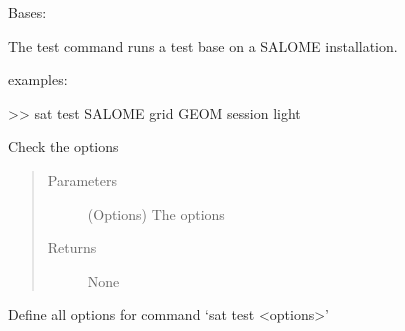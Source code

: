\documentclass[a4paper,10pt,english]{sphinxmanual}
\begin{document}
\begin{fulllineitems}
\label{\detokenize{apidoc_commands/commands:commands.test.Command}}
Bases: 

The test command runs a test base on a SALOME installation.

\begin{DUlineblock}{0em}
\item[] examples:
\item[] \textgreater{}\textgreater{} sat test SALOME \textendash{}grid GEOM \textendash{}session light
\end{DUlineblock}

\begin{fulllineitems}
\label{\detokenize{apidoc_commands/commands:commands.test.Command.check_option}}
Check the options
\begin{quote}\begin{description}
\item[{Parameters}] \leavevmode
{} \textendash{} (Options) The options

\item[{Returns}] \leavevmode
None

\end{description}\end{quote}

\end{fulllineitems}


\begin{fulllineitems}
\label{\detokenize{apidoc_commands/commands:commands.test.Command.getParser}}
Define all options for command ‘sat test \textless{}options\textgreater{}’

\end{fulllineitems}


\begin{fulllineitems}
\label{\detokenize{apidoc_commands/commands:commands.test.Command.name}}
\end{fulllineitems}


\end{fulllineitems}
\end{document}
